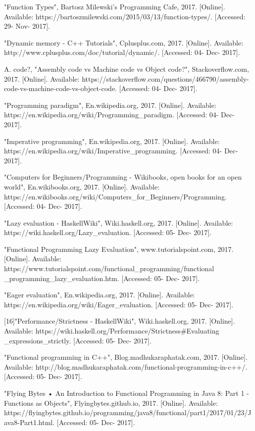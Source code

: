 \documentclass[conference]{IEEEtran}
\begin{document}
\begin{thebibliography}{00}
 "Function Types", Bartosz Milewski's Programming Cafe, 2017. [Online]. Available: https://bartoszmilewski.com/2015/03/13/function-types/. [Accessed: 29- Nov- 2017].

 "Dynamic memory - C++ Tutorials", Cplusplus.com, 2017. [Online]. Available: http://www.cplusplus.com/doc/tutorial/dynamic/. [Accessed: 04- Dec- 2017].

 A. code?, "Assembly code vs Machine code vs Object code?", Stackoverflow.com, 2017. [Online]. Available: https://stackoverflow.com/questions/466790/assembly-code-vs-machine-code-vs-object-code. [Accessed: 04- Dec- 2017].

 "Programming paradigm", En.wikipedia.org, 2017. [Online]. Available: https://en.wikipedia.org/wiki/Programming\_paradigm. [Accessed: 04- Dec- 2017].

 "Imperative programming", En.wikipedia.org, 2017. [Online]. Available: https://en.wikipedia.org/wiki/Imperative\_programming. [Accessed: 04- Dec- 2017].

 "Computers for Beginners/Programming - Wikibooks, open books for an open world", En.wikibooks.org, 2017. [Online]. Available: https://en.wikibooks.org/wiki/Computers\_for\_Beginners/Programming. [Accessed: 04- Dec- 2017].

 "Lazy evaluation - HaskellWiki", Wiki.haskell.org, 2017. [Online]. Available: https://wiki.haskell.org/Lazy\_evaluation. [Accessed: 05- Dec- 2017].

 "Functional Programming Lazy Evaluation", www.tutorialspoint.com, 2017. [Online]. Available: https://www.tutorialspoint.com/functional\_programming/functional
\_programming\_lazy\_evaluation.htm. [Accessed: 05- Dec- 2017].

 "Eager evaluation", En.wikipedia.org, 2017. [Online]. Available: https://en.wikipedia.org/wiki/Eager\_evaluation. [Accessed: 05- Dec- 2017].

 [16]"Performance/Strictness - HaskellWiki", Wiki.haskell.org, 2017. [Online]. Available: https://wiki.haskell.org/Performance/Strictness\#Evaluating
\_expressions\_strictly. [Accessed: 05- Dec- 2017].

 "Functional programming in C++", Blog.madhukaraphatak.com, 2017. [Online]. Available: http://blog.madhukaraphatak.com/functional-programming-in-c++/. [Accessed: 05- Dec- 2017].

 "Flying Bytes • An Introduction to Functional Programming in Java 8: Part 1 - Functions as Objects", Flyingbytes.github.io, 2017. [Online]. Available: https://flyingbytes.github.io/programming/java8/functional/part1/2017/01/23/Java8-Part1.html. [Accessed: 05- Dec- 2017].

\end{thebibliography}
\end{document}
